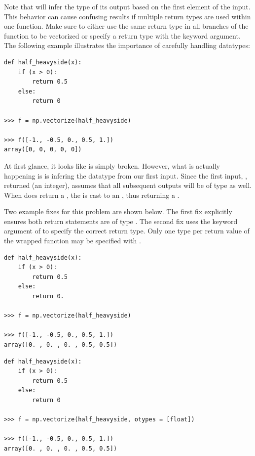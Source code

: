 \begin{warn}

Note that  will infer the type of its output based on the first element of the input.
This behavior can cause confusing results if multiple return types are used within one function.
Make sure to either use the same return type in all branches of the function to be vectorized or specify a return type with the  keyword argument.
The following example illustrates the importance of carefully handling datatypes:


\begin{lstlisting}
def half_heavyside(x):
	if (x > 0):
		return 0.5
	else:
		return 0

>>> f = np.vectorize(half_heavyside)

>>> f([-1., -0.5, 0., 0.5, 1.])
array([0, 0, 0, 0, 0])

\end{lstlisting}

At first glance, it looks like  is simply broken.
However, what is actually happening is  is infering the datatype from our first input.
Since the first input, , returned  (an integer),  assumes that all subsequent outputs will be of type  as well.
When  does return a , the  is cast to an , thus returning a .

Two example fixes for this problem are shown below.
The first fix explicitly ensures both return statements are of type .
The second fix uses the  keyword argument of  to specify the correct return type.
Only one type per return value of the wrapped function may be specified with .

\begin{lstlisting}
def half_heavyside(x):
	if (x > 0):
		return 0.5
	else:
		return 0.

>>> f = np.vectorize(half_heavyside)

>>> f([-1., -0.5, 0., 0.5, 1.])
array([0. , 0. , 0. , 0.5, 0.5])

\end{lstlisting}

\begin{lstlisting}
def half_heavyside(x):
	if (x > 0):
		return 0.5
	else:
		return 0

>>> f = np.vectorize(half_heavyside, otypes = [float])

>>> f([-1., -0.5, 0., 0.5, 1.])
array([0. , 0. , 0. , 0.5, 0.5])

\end{lstlisting}

\end{warn}

